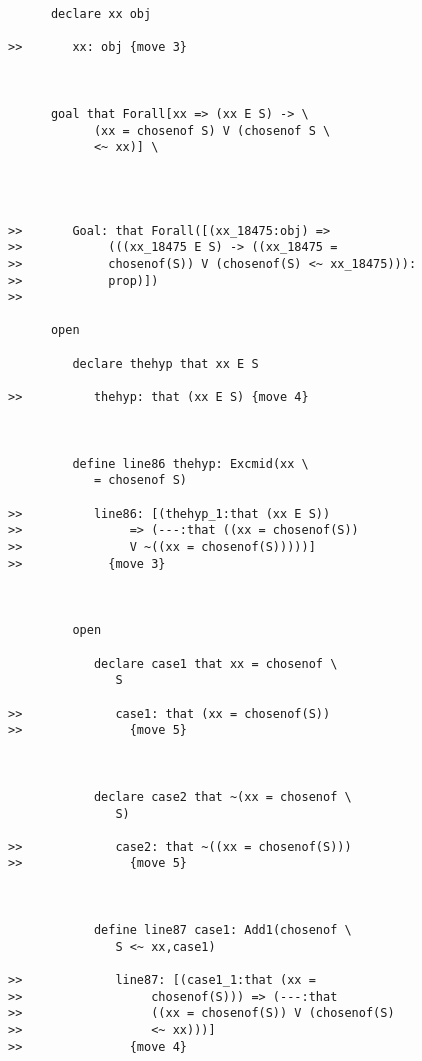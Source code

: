 \documentclass[12pt]{article}
\begin{document}
\begin{verbatim}
      declare xx obj

>>       xx: obj {move 3}



      goal that Forall[xx => (xx E S) -> \
            (xx = chosenof S) V (chosenof S \
            <~ xx)] \
         



>>       Goal: that Forall([(xx_18475:obj) =>
>>            (((xx_18475 E S) -> ((xx_18475 =
>>            chosenof(S)) V (chosenof(S) <~ xx_18475))):
>>            prop)])
>>         

      open

         declare thehyp that xx E S

>>          thehyp: that (xx E S) {move 4}



         define line86 thehyp: Excmid(xx \
            = chosenof S)

>>          line86: [(thehyp_1:that (xx E S))
>>               => (---:that ((xx = chosenof(S))
>>               V ~((xx = chosenof(S)))))]
>>            {move 3}



         open

            declare case1 that xx = chosenof \
               S

>>             case1: that (xx = chosenof(S))
>>               {move 5}



            declare case2 that ~(xx = chosenof \
               S)

>>             case2: that ~((xx = chosenof(S)))
>>               {move 5}



            define line87 case1: Add1(chosenof \
               S <~ xx,case1)

>>             line87: [(case1_1:that (xx =
>>                  chosenof(S))) => (---:that
>>                  ((xx = chosenof(S)) V (chosenof(S)
>>                  <~ xx)))]
>>               {move 4}


\end{verbatim}
\end{document}
